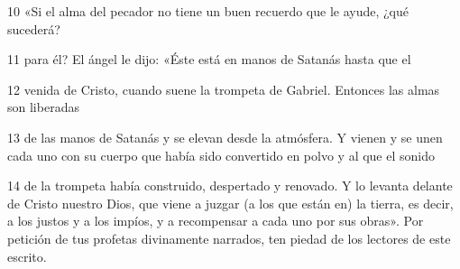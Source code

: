 \par 10 «Si el alma del pecador no tiene un buen recuerdo que le ayude, ¿qué sucederá?

\par 11 para él? El ángel le dijo: «Éste está en manos de Satanás hasta que el

\par 12 venida de Cristo, cuando suene la trompeta de Gabriel. Entonces las almas son liberadas

\par 13 de las manos de Satanás y se elevan desde la atmósfera. Y vienen y se unen cada uno con su cuerpo que había sido convertido en polvo y al que el sonido

\par 14 de la trompeta había construido, despertado y renovado. Y lo levanta delante de Cristo nuestro Dios, que viene a juzgar (a los que están en) la tierra, es decir, a los justos y a los impíos, y a recompensar a cada uno por sus obras». Por petición de tus profetas divinamente narrados, ten piedad de los lectores de este escrito.

